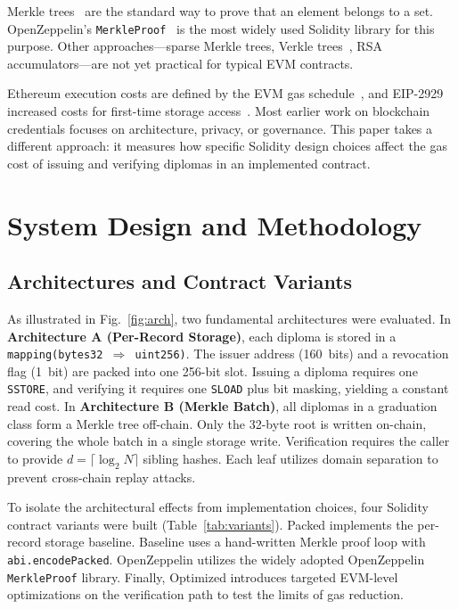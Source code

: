 \documentclass[conference]{IEEEtran}
\newcommand{\Vpacked}{Packed}
\newcommand{\Vbase}{Baseline}
\newcommand{\Voz}{OpenZeppelin}
\newcommand{\Vopt}{Optimized}
\begin{document}
Merkle trees~\cite{merkle1987} are the standard way to
prove that an element belongs to a set.
OpenZeppelin's \texttt{MerkleProof}~\cite{openzeppelin}
is the most widely used Solidity library for this purpose.
Other approaches---sparse Merkle trees, Verkle
trees~\cite{verkle}, RSA accumulators---are not yet
practical for typical EVM contracts.

Ethereum execution costs are defined by the EVM gas
schedule~\cite{yellowpaper}, and EIP-2929 increased
costs for first-time storage access~\cite{eip2929}.
Most earlier work on blockchain credentials focuses on
architecture, privacy, or governance.
This paper takes a different approach: it measures how
specific Solidity design choices affect the gas cost
of issuing and verifying diplomas in an implemented contract.

\section{System Design and Methodology}
\label{sec:method}

\subsection{Architectures and Contract Variants}

As illustrated in Fig.~\ref{fig:arch}, two fundamental architectures 
were evaluated. In \textbf{Architecture A (Per-Record Storage)}, each 
diploma is stored in a \texttt{mapping(bytes32\,$\Rightarrow$\,uint256)}. 
The issuer address (160~bits) and a revocation flag (1~bit) are packed 
into one 256-bit slot. Issuing a diploma requires one \texttt{SSTORE}, 
and verifying it requires one \texttt{SLOAD} plus bit masking, 
yielding a constant read cost. In \textbf{Architecture B (Merkle Batch)}, 
all diplomas in a graduation class form a Merkle tree off-chain. Only the 
32-byte root is written on-chain, covering the whole batch in a single 
storage write. Verification requires the caller to provide 
$d{=}\lceil \log_2 N \rceil$ sibling hashes. Each leaf utilizes domain 
separation to prevent cross-chain replay attacks.

To isolate the architectural effects from implementation choices, 
four Solidity contract variants were built (Table~\ref{tab:variants}). 
\Vpacked{} implements the per-record storage baseline. \Vbase{} uses a 
hand-written Merkle proof loop with \texttt{abi.encodePacked}. \Voz{} 
utilizes the widely adopted OpenZeppelin \texttt{MerkleProof} library. 
Finally, \Vopt{} introduces targeted EVM-level optimizations on the 
verification path to test the limits of gas reduction.
\end{document}
